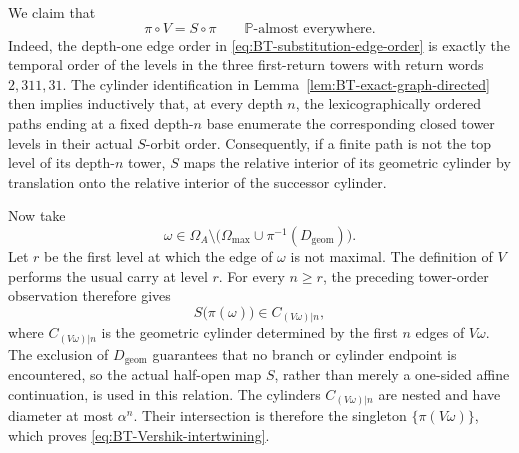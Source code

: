 \documentclass[11pt]{amsart}
\theoremstyle{plain}
\theoremstyle{definition}
\theoremstyle{remark}
\begin{document}
We claim that
\[
        \pi\circ V
        =
        S\circ\pi
        \qquad
        \mathbb P\text{-almost everywhere}.
\tag{B.12}
\label{eq:BT-Vershik-intertwining}
\]
Indeed, the depth-one edge order in
\eqref{eq:BT-substitution-edge-order} is exactly the temporal order of
the levels in the three first-return towers with return words
\(2,311,31\). The cylinder identification in
Lemma~\ref{lem:BT-exact-graph-directed} then implies inductively that,
at every depth \(n\), the lexicographically ordered paths ending at a
fixed depth-\(n\) base enumerate the corresponding closed tower levels
in their actual \(S\)-orbit order. Consequently, if a finite path is
not the top level of its depth-\(n\) tower, \(S\) maps the relative
interior of its geometric cylinder by translation onto the relative
interior of the successor cylinder.

Now take
\[
        \omega\in
        \Omega_A\setminus
        \bigl(
        \Omega_{\max}
        \cup
        \pi^{-1}(D_{\mathrm{geom}})
        \bigr).
\]
Let \(r\) be the first level at which the edge of \(\omega\) is not
maximal. The definition of \(V\) performs the usual carry at level
\(r\). For every \(n\geq r\), the preceding tower-order observation
therefore gives
\[
        S\bigl(\pi(\omega)\bigr)
        \in
        C_{(V\omega)|n},
\]
where \(C_{(V\omega)|n}\) is the geometric cylinder determined by the
first \(n\) edges of \(V\omega\). The exclusion of
\(D_{\mathrm{geom}}\) guarantees that no branch or cylinder endpoint is
encountered, so the actual half-open map \(S\), rather than merely a
one-sided affine continuation, is used in this relation. The cylinders
\(C_{(V\omega)|n}\) are nested and have diameter at most \(\alpha^n\).
Their intersection is therefore the singleton \(\{\pi(V\omega)\}\),
which proves
\eqref{eq:BT-Vershik-intertwining}.
\end{document}
